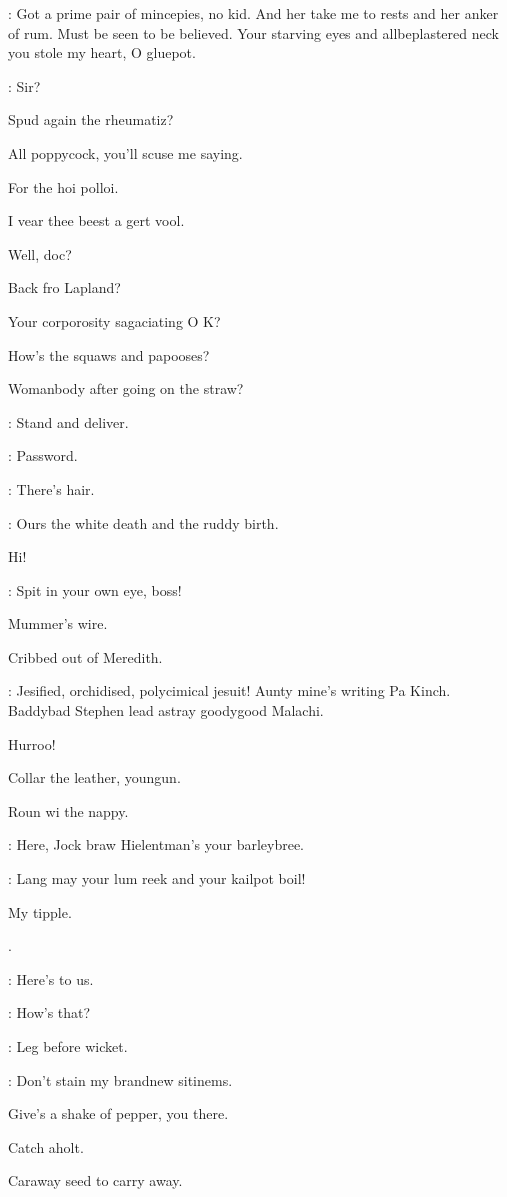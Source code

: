 \dixon: Got a prime pair of mincepies, no kid.
And her take me to rests and her anker of rum.
Must be seen to be believed.
Your starving eyes and allbeplastered neck you stole my heart, O gluepot.

\barman: Sir?

Spud again the rheumatiz?

All poppycock, you'll scuse me saying.

For the hoi polloi.

I vear thee beest a gert vool.

Well, doc?

Back fro Lapland?

Your corporosity sagaciating O K?

How's the squaws and papooses?

Womanbody after going on the straw?

\lenehan: Stand and deliver.

\crotthers: Password.

\punch: There's hair.

\Bloom: Ours the white death and the ruddy birth.

Hi!

\bannon: Spit in your own eye, boss!

Mummer's wire.

Cribbed out of Meredith.

\mulligan: Jesified, orchidised, polycimical jesuit!
Aunty mine's writing Pa Kinch.
Baddybad Stephen lead astray goodygood Malachi.


Hurroo!

Collar the leather, youngun.

Roun wi the nappy.

\lenehan: Here, Jock braw Hielentman's your barleybree.

\crotthers: Lang may your lum reek and your kailpot boil!

My tipple.

.

\dixon: Here's to us.

\madden: How's that?

\lynch: Leg before wicket.

\mulligan: Don't stain my brandnew sitinems.

Give's a shake of pepper, you there.

Catch aholt.

Caraway seed to carry away.

